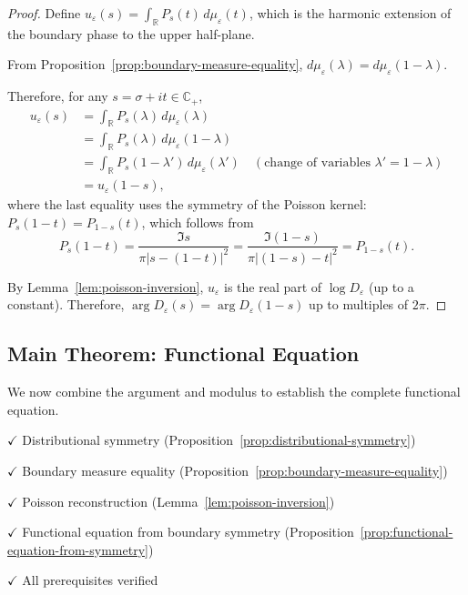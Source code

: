﻿\documentclass[12pt,a4paper]{article}
\theoremstyle{definition}
\theoremstyle{remark}
\newcommand{\CC}{\mathbb{C}}
\newcommand{\RR}{\mathbb{R}}
\begin{document}
\begin{proof}
Define $u_\varepsilon(s) = \int_\RR P_s(t) \, d\mu_\varepsilon(t)$, which is the harmonic extension of the boundary phase to the upper half-plane.

From Proposition~\ref{prop:boundary-measure-equality}, $d\mu_\varepsilon(\lambda) = d\mu_\varepsilon(1-\lambda)$.

Therefore, for any $s = \sigma + it \in \CC_+$,
\begin{align*}
u_\varepsilon(s) &= \int_\RR P_s(\lambda) \, d\mu_\varepsilon(\lambda) \\
&= \int_\RR P_s(\lambda) \, d\mu_\varepsilon(1-\lambda) \\
&= \int_\RR P_s(1-\lambda') \, d\mu_\varepsilon(\lambda') \quad (\text{change of variables } \lambda' = 1-\lambda) \\
&= u_\varepsilon(1-s),
\end{align*}
where the last equality uses the symmetry of the Poisson kernel: $P_s(1-t) = P_{1-s}(t)$, which follows from
\[
P_s(1-t) = \frac{\Im s}{\pi|s-(1-t)|^2} = \frac{\Im(1-s)}{\pi|(1-s)-t|^2} = P_{1-s}(t).
\]

By Lemma~\ref{lem:poisson-inversion}, $u_\varepsilon$ is the real part of $\log D_\varepsilon$ (up to a constant). Therefore, $\arg D_\varepsilon(s) = \arg D_\varepsilon(1-s)$ up to multiples of $2\pi$.
\end{proof}

\subsection{Main Theorem: Functional Equation}

We now combine the argument and modulus to establish the complete functional equation.

\begin{checklist}
\item[$\checkmark$] Distributional symmetry (Proposition~\ref{prop:distributional-symmetry})
\item[$\checkmark$] Boundary measure equality (Proposition~\ref{prop:boundary-measure-equality})
\item[$\checkmark$] Poisson reconstruction (Lemma~\ref{lem:poisson-inversion})
\item[$\checkmark$] Functional equation from boundary symmetry (Proposition~\ref{prop:functional-equation-from-symmetry})
\item[$\checkmark$] All prerequisites verified
\end{checklist}
\end{document}
